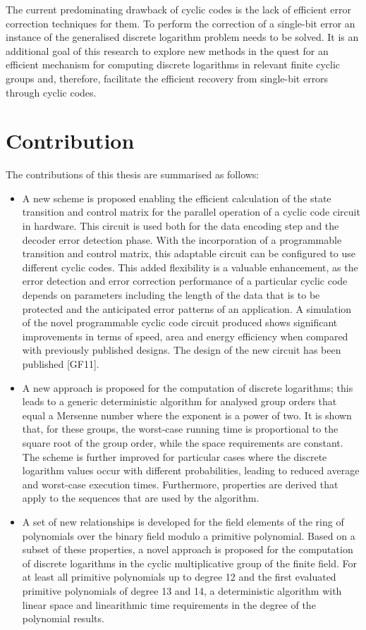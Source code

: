 \documentclass[oneside, a4paper, 11pt]{memoir}
\begin{document}
The current predominating drawback of cyclic codes is the lack of efficient error correction techniques for them. To perform the correction of a single-bit error an instance of the generalised discrete logarithm problem needs to be solved. It is an additional goal of this research to explore new methods in the quest for an efficient mechanism for computing discrete logarithms in relevant finite cyclic groups and, therefore, facilitate the efficient recovery from single-bit errors through cyclic codes.

\section{Contribution}
The contributions of this thesis are summarised as follows:

\begin{itemize}
\item A new scheme is proposed enabling the efficient calculation of the state transition and control matrix for the parallel operation of a cyclic code circuit in hardware. This circuit is used both for the data encoding step and the decoder error detection phase. With the incorporation of a programmable transition and control matrix, this adaptable circuit can be configured to use different cyclic codes. This added flexibility is a valuable enhancement, as the error detection and error correction performance of a particular cyclic code depends on parameters including the length of the data that is to be protected and the anticipated error patterns of an application. A simulation of the novel programmable cyclic code circuit produced shows significant improvements in terms of speed, area and energy efficiency when compared with previously published designs. The design of the new circuit has been published [GF11].
\item A new approach is proposed for the computation of discrete logarithms; this leads to a generic deterministic algorithm for analysed group orders that equal a Mersenne number where the exponent is a power of two. It is shown that, for these groups, the worst-case running time is proportional to the square root of the group order, while the space requirements are constant. The scheme is further improved for particular cases where the discrete logarithm values occur with different probabilities, leading to reduced average and worst-case execution times. Furthermore, properties are derived that apply to the sequences that are used by the algorithm.
\item A set of new relationships is developed for the field elements of the ring of polynomials over the binary field modulo a primitive polynomial. Based on a subset of these properties, a novel approach is proposed for the computation of discrete logarithms in the cyclic multiplicative group of the finite field. For at least all primitive polynomials up to degree 12 and the first evaluated primitive polynomials of degree 13 and 14, a deterministic algorithm with linear space and linearithmic time requirements in the degree of the polynomial results.
\end{itemize}
\end{document}
